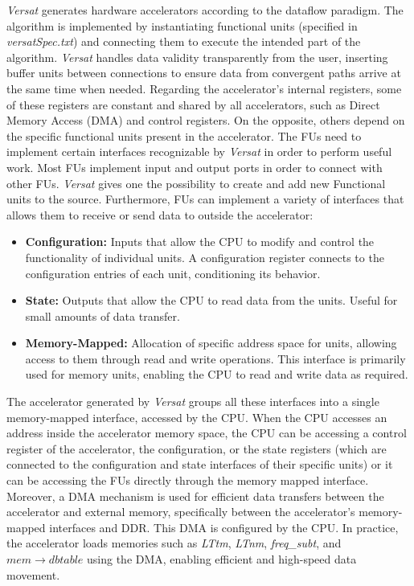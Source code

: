 \textit{Versat} generates hardware accelerators according to the dataflow paradigm. The algorithm is implemented by instantiating functional units (specified in \textit{versatSpec.txt}) and connecting them to execute the intended part of the algorithm. \textit{Versat} handles data validity transparently from the user, inserting buffer units between connections to ensure data from convergent paths arrive at the same time when needed.
Regarding the accelerator's internal registers, some of these registers are constant and shared by all accelerators, such as Direct Memory Access (DMA) and control registers. On the opposite, others depend on the specific functional units present in the accelerator.
The FUs need to implement certain interfaces recognizable by \textit{Versat} in order to perform useful work. Most FUs implement input and output ports in order to connect with other FUs. \textit{Versat} gives one the possibility to create and add new Functional units to the source. Furthermore, FUs can implement a variety of interfaces that allows them to receive or send data to outside the accelerator:

\begin{itemize}
    \item \textbf{Configuration:} Inputs that allow the CPU to modify and control the functionality of individual units. A configuration register connects to the configuration entries of each unit, conditioning its behavior. 
    \item \textbf{State:} Outputs that allow the CPU to read data from the units. Useful for small amounts of data transfer.
    \item \textbf{Memory-Mapped:} Allocation of specific address space for units, allowing access to them through read and write operations. This interface is primarily used for memory units, enabling the CPU to read and write data as required.
\end{itemize}

The accelerator generated by \textit{Versat} groups all these interfaces into a single memory-mapped interface, accessed by the CPU. When the CPU accesses an address inside the accelerator memory space, the CPU can be accessing a control register of the accelerator, the configuration, or the state registers (which are connected to the configuration and state interfaces of their specific units) or it can be accessing the FUs directly through the memory mapped interface.
Moreover, a DMA mechanism is used for efficient data transfers between the accelerator and external memory, specifically between the accelerator's memory-mapped interfaces and DDR. This DMA is configured by the CPU. In practice, the accelerator loads memories such as \textit{LTtm}, \textit{LTnm}, \textit{freq\_subt}, and $mem\to dbtable$ using the DMA, enabling efficient and high-speed data movement.

